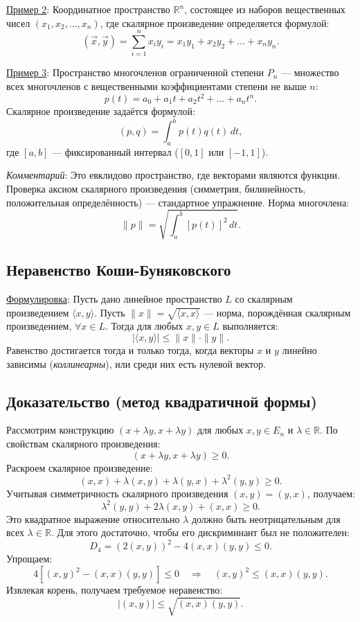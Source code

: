\documentclass[12pt]{article}
\begin{document}
\underline{Пример 2}: Координатное пространство $\mathbb{R}^n$, состоящее из наборов вещественных чисел $(x_1, x_2, \dots, x_n)$, где скалярное произведение определяется формулой:
$$
(\vec{x}, \vec{y}) = \sum_{i=1}^n x_i y_i = x_1 y_1 + x_2 y_2 + \dots + x_n y_n.
$$

\underline{Пример 3}: Пространство многочленов ограниченной степени $P_n$ — множество всех многочленов с вещественными коэффициентами степени не выше $n$:  
$$
p(t) = a_0 + a_1 t + a_2 t^2 + \dots + a_n t^n.
$$  
Скалярное произведение задаётся формулой:  
$$
(p, q) = \int_a^b p(t)q(t)\,dt,
$$  
где $[a, b]$ — фиксированный интервал ($[0, 1]$ или $[-1, 1]$).  

\textit{Комментарий}: Это евклидово пространство, где векторами являются функции. Проверка аксиом скалярного произведения (симметрия, билинейность, положительная определённость) — стандартное упражнение. Норма многочлена:  
$$
\|p\| = \sqrt{\int_a^b [p(t)]^2\,dt}.
$$


\subsection*{Неравенство Коши-Буняковского}
\underline{Формулировка}:  
Пусть дано линейное пространство $L$ со скалярным произведением $\langle x, y \rangle$. Пусть $\|x\| = \sqrt{\langle x, x \rangle}$ — норма, порождённая скалярным произведением, $\forall x \in L$. Тогда для любых $x, y \in L$ выполняется:
$$
|\langle x, y \rangle| \leq \|x\| \cdot \|y\|.
$$
Равенство достигается тогда и только тогда, когда векторы $x$ и $y$ линейно зависимы (\textit{коллинеарны}), или среди них есть нулевой вектор.

\subsection*{Доказательство (метод квадратичной формы)}
Рассмотрим конструкцию $(x + \lambda y, x + \lambda y)$ для любых $x, y \in E_n$ и $\lambda \in \mathbb{R}$. По свойствам скалярного произведения:
$$
(x + \lambda y, x + \lambda y) \geq 0.
$$
Раскроем скалярное произведение:
$$
(x, x) + \lambda (x, y) + \lambda (y, x) + \lambda^2 (y, y) \geq 0.
$$
Учитывая симметричность скалярного произведения $(x, y) = (y, x)$, получаем:
$$
\lambda^2 (y, y) + 2\lambda (x, y) + (x, x) \geq 0.
$$
Это квадратное выражение относительно $\lambda$ должно быть неотрицательным для всех $\lambda \in \mathbb{R}$. Для этого достаточно, чтобы его дискриминант был не положителен:
$$
D_4 = (2(x, y))^2 - 4(x, x)(y, y) \leq 0.
$$
Упрощаем:
$$
4[(x, y)^2 - (x, x)(y, y)] \leq 0 \quad \Rightarrow \quad (x, y)^2 \leq (x, x)(y, y).
$$
Извлекая корень, получаем требуемое неравенство:
$$
|(x, y)| \leq \sqrt{(x, x)(y, y)}.
$$
\end{document}
